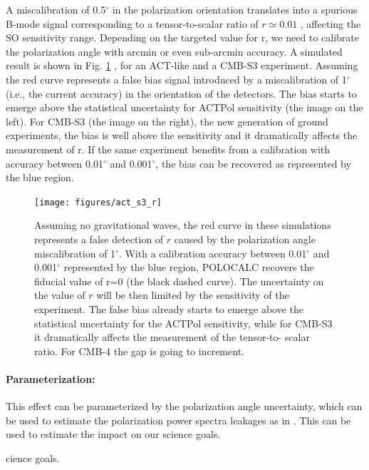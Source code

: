 A miscalibration of 0.5$^{\circ}$ in the polarization orientation translates
into a spurious B-mode signal corresponding to a tensor-to-scalar ratio of $r
\simeq 0.01$ \cite{abitbol16}, affecting the SO sensitivity range.  Depending
on the targeted value for r, we need to calibrate the polarization angle with
arcmin or even sub-arcmin accuracy. 
A simulated result is shown in Fig. \ref{plot_r:fig} \cite{nati_2017}, for an
ACT-like and a CMB-S3 experiment. Assuming  the red curve represents a false
bias signal introduced by a miscalibration of 1$^{\circ}$ (i.e., the current
accuracy) in the orientation of the detectors.  The bias starts to emerge above
the statistical uncertainty for ACTPol sensitivity (the image on the left). For
CMB-S3 (the image on the right), the new generation of ground experiments, the
bias is well above the sensitivity and it dramatically affects the measurement
of r. If the same experiment benefits from a calibration with accuracy between
0.01$^{\circ}$ and 0.001$^{\circ}$, the bias can be recovered as represented by
the blue region.
 
\begin{figure}[ht]
\begin{center}
\texttt{[image: figures/act\_s3\_r]} 
\end{center}
\caption{Assuming no gravitational waves, the red curve in these simulations
represents a false detection of $r$ caused by the polarization angle
miscalibration of 1$^{\circ}$. With a calibration accuracy between
0.01$^{\circ}$ and 0.001$^{\circ}$ represented by the blue region, POLOCALC
\cite{nati_2017} recovers the fiducial value of r=0 (the black dashed curve).
The uncertainty on the value of $r$ will be then limited by the sensitivity of
the experiment. The false bias already starts to emerge above the statistical
uncertainty for the ACTPol sensitivity, while for CMB-S3 it dramatically
affects the measurement of the tensor-to- scalar ratio. For CMB-4 the gap is
going to increment.}
\label{plot_r:fig}
\end{figure}

\paragraph{Parameterization:}
This effect can be parameterized by the polarization angle uncertainty, which
can be used to estimate the polarization power spectra leakages as in
\cite{nati_2017}. This can be used to estimate the impact on our
science goals.

cience goals.
